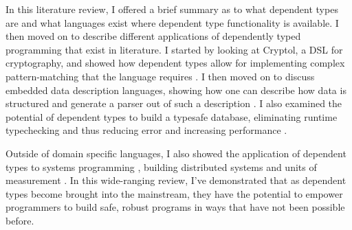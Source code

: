 In this literature review, I offered a brief summary as to what dependent types
are and what languages exist where dependent type functionality is available. I
then moved on to describe different applications of dependently typed
programming that exist in literature. I started by looking at Cryptol, a DSL for
cryptography, and showed how dependent types allow for implementing complex
pattern-matching that the language requires \cite{power_of_pi}. I then moved on
to discuss embedded data description languages, showing how one can describe how
data is structured and generate a parser out of such a description
\cite{power_of_pi}. I also examined the potential of dependent types to build a
typesafe database, eliminating runtime typechecking and thus reducing error and
increasing performance \cite{power_of_pi,eisenberg2016}. 

Outside of domain specific languages, I also showed the application of dependent
types to systems programming \cite{idris_systems_programming}, building
distributed systems \cite{fstar_distributed_programming} and units of
measurement \cite{gundry2013}. In this wide-ranging review, I've demonstrated
that as dependent types become brought into the mainstream, they have the
potential to empower programmers to build safe, robust programs in ways that
have not been possible before. 